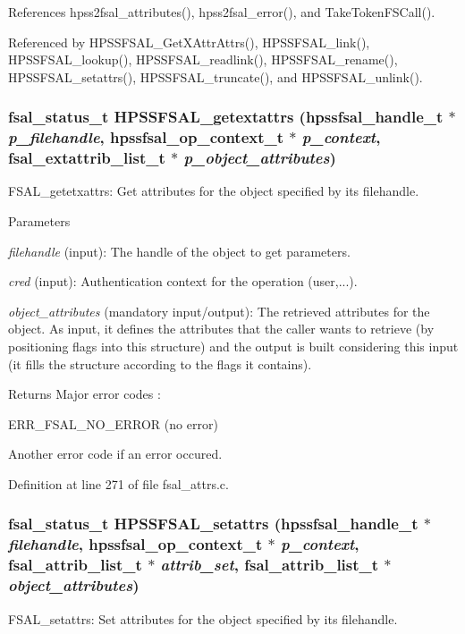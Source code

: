 References hpss2fsal\_\-attributes(), hpss2fsal\_\-error(), and TakeTokenFSCall().

Referenced by HPSSFSAL\_\-GetXAttrAttrs(), HPSSFSAL\_\-link(), HPSSFSAL\_\-lookup(), HPSSFSAL\_\-readlink(), HPSSFSAL\_\-rename(), HPSSFSAL\_\-setattrs(), HPSSFSAL\_\-truncate(), and HPSSFSAL\_\-unlink().
\subsubsection[{HPSSFSAL\_\-getextattrs}]{\setlength{\rightskip}{0pt plus 5cm}fsal\_\-status\_\-t HPSSFSAL\_\-getextattrs (hpssfsal\_\-handle\_\-t $\ast$ {\em p\_\-filehandle}, \/  hpssfsal\_\-op\_\-context\_\-t $\ast$ {\em p\_\-context}, \/  fsal\_\-extattrib\_\-list\_\-t $\ast$ {\em p\_\-object\_\-attributes})}\label{fsal__attrs_8c_aae4d69cc7b4b5613131139bd50d9905b}
FSAL\_\-getetxattrs: Get attributes for the object specified by its filehandle.


\begin{DoxyParams}{Parameters}
\item[{\em filehandle}](input): The handle of the object to get parameters. \item[{\em cred}](input): Authentication context for the operation (user,...). \item[{\em object\_\-attributes}](mandatory input/output): The retrieved attributes for the object. As input, it defines the attributes that the caller wants to retrieve (by positioning flags into this structure) and the output is built considering this input (it fills the structure according to the flags it contains).\end{DoxyParams}
\begin{DoxyReturn}{Returns}
Major error codes :
\begin{DoxyItemize}
\item ERR\_\-FSAL\_\-NO\_\-ERROR (no error)
\item Another error code if an error occured. 
\end{DoxyItemize}
\end{DoxyReturn}


Definition at line 271 of file fsal\_\-attrs.c.
\subsubsection[{HPSSFSAL\_\-setattrs}]{\setlength{\rightskip}{0pt plus 5cm}fsal\_\-status\_\-t HPSSFSAL\_\-setattrs (hpssfsal\_\-handle\_\-t $\ast$ {\em filehandle}, \/  hpssfsal\_\-op\_\-context\_\-t $\ast$ {\em p\_\-context}, \/  fsal\_\-attrib\_\-list\_\-t $\ast$ {\em attrib\_\-set}, \/  fsal\_\-attrib\_\-list\_\-t $\ast$ {\em object\_\-attributes})}\label{fsal__attrs_8c_a03a904f9336c285d77ea129b73783b89}
FSAL\_\-setattrs: Set attributes for the object specified by its filehandle.


